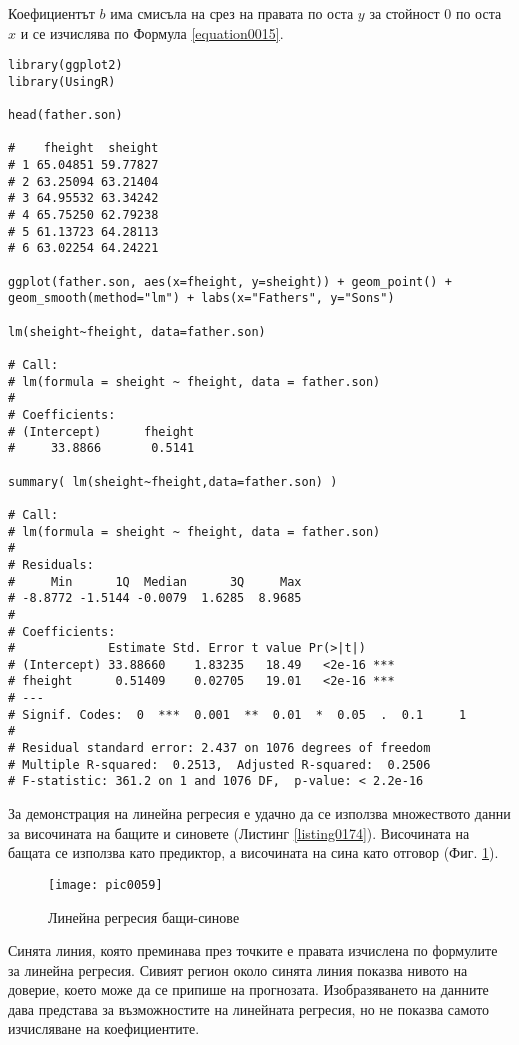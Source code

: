 Коефициентът $b$ има смисъла на срез на правата по оста $y$ за стойност 0 по оста $x$ и се изчислява по Формула \ref{equation0015}. 

\begin{lstlisting}[caption=Линейна регресия, label=listing0174]
library(ggplot2)
library(UsingR)

head(father.son)

#    fheight  sheight
# 1 65.04851 59.77827
# 2 63.25094 63.21404
# 3 64.95532 63.34242
# 4 65.75250 62.79238
# 5 61.13723 64.28113
# 6 63.02254 64.24221

ggplot(father.son, aes(x=fheight, y=sheight)) + geom_point() + geom_smooth(method="lm") + labs(x="Fathers", y="Sons")

lm(sheight~fheight, data=father.son)

# Call:
# lm(formula = sheight ~ fheight, data = father.son)
# 
# Coefficients:
# (Intercept)      fheight  
#     33.8866       0.5141  

summary( lm(sheight~fheight,data=father.son) )

# Call:
# lm(formula = sheight ~ fheight, data = father.son)
# 
# Residuals:
#     Min      1Q  Median      3Q     Max 
# -8.8772 -1.5144 -0.0079  1.6285  8.9685 
# 
# Coefficients:
#             Estimate Std. Error t value Pr(>|t|)    
# (Intercept) 33.88660    1.83235   18.49   <2e-16 ***
# fheight      0.51409    0.02705   19.01   <2e-16 ***
# ---
# Signif. Codes:  0  ***  0.001  **  0.01  *  0.05  .  0.1     1
# 
# Residual standard error: 2.437 on 1076 degrees of freedom
# Multiple R-squared:  0.2513,	Adjusted R-squared:  0.2506 
# F-statistic: 361.2 on 1 and 1076 DF,  p-value: < 2.2e-16
\end{lstlisting}

За демонстрация на линейна регресия е удачно да се използва множеството данни за височината на бащите и синовете (Листинг \ref{listing0174}). Височината на бащата се използва като предиктор, а височината на сина като отговор (Фиг. \ref{figure0059}).

\begin{figure}[h!]
  \centering
  \texttt{[image: pic0059]}
  \caption{Линейна регресия бащи-синове}
\label{figure0059}
\end{figure}
\FloatBarrier

Синята линия, която преминава през точките е правата изчислена по формулите за линейна регресия. Сивият регион около синята линия показва нивото на доверие, което може да се припише на прогнозата. Изобразяването на данните дава представа за възможностите на линейната регресия, но не показва самото изчисляване на коефициентите. 

